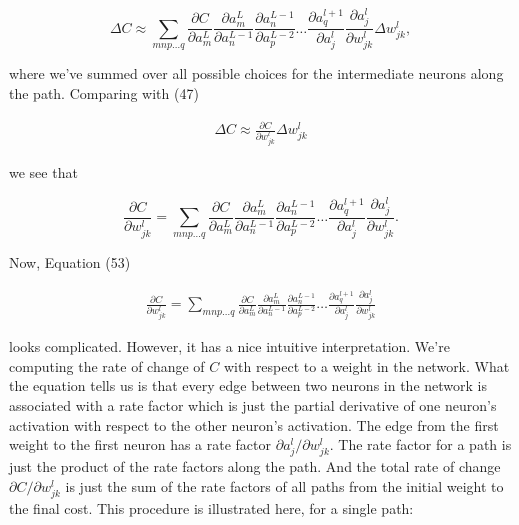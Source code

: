 \begin{equation}
\Delta C \approx \sum_{mnp\ldots q} \frac{\partial C}{\partial a^L_m} \frac{\partial a^L_m}{\partial a^{L-1}_n} \frac{\partial a^{L-1}_n}{\partial a^{L-2}_p} \ldots \frac{\partial a^{l+1}_q}{\partial a^l_j} \frac{\partial a^l_j}{\partial w^l_{jk}} \Delta w^l_{jk},
\tag{52}
\end{equation}

\noindent where we've summed over all possible choices for the intermediate neurons along the path. Comparing with (47)

\begin{align*}
\Delta C \approx \frac{\partial C}{\partial w^l_{jk}} \Delta w^l_{jk} \nonumber
\end{align*}

\noindent we see that

\begin{equation}
\frac{\partial C}{\partial w^l_{jk}} = \sum_{mnp\ldots q} \frac{\partial C}{\partial a^L_m} \frac{\partial a^L_m}{\partial a^{L-1}_n} \frac{\partial a^{L-1}_n}{\partial a^{L-2}_p} \ldots \frac{\partial a^{l+1}_q}{\partial a^l_j} \frac{\partial a^l_j}{\partial w^l_{jk}}.
\tag{53}
\end{equation}

\noindent Now, Equation (53)

\begin{align*}
\frac{\partial C}{\partial w^l_{jk}} = \sum_{mnp\ldots q} \frac{\partial C}{\partial a^L_m} \frac{\partial a^L_m}{\partial a^{L-1}_n} \frac{\partial a^{L-1}_n}{\partial a^{L-2}_p} \ldots \frac{\partial a^{l+1}_q}{\partial a^l_j} \frac{\partial a^l_j}{\partial w^l_{jk}} \nonumber
\end{align*}

\noindent looks complicated. However, it has a nice intuitive interpretation. We're computing the rate of change of $C$ with respect to a weight in the network. What the equation tells us is that every edge between two neurons in the network is associated with a rate factor which is just the partial derivative of one neuron's activation with respect to the other neuron's activation. The edge from the first weight to the first neuron has a rate factor $\partial a^{l}_j / \partial w^l_{jk}$. The rate factor for a path is just the product of the rate factors along the path. And the total rate of change $\partial C / \partial w^l_{jk}$ is just the sum of the rate factors of all paths from the initial weight to the final cost. This procedure is illustrated here, for a single path:

